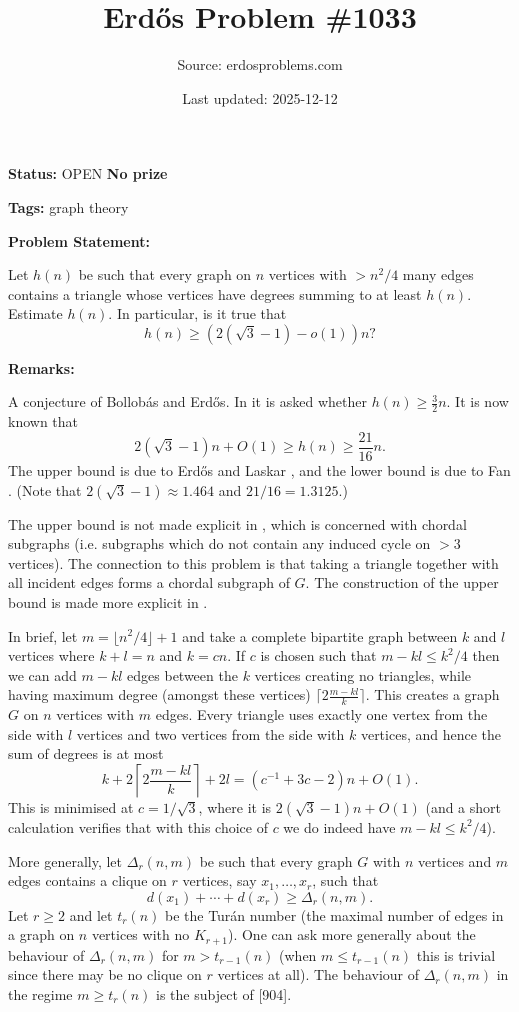 \documentclass{article}
\title{Erd\H{o}s Problem \#1033}
\date{Last updated: 2025-12-12}
\author{Source: erdosproblems.com}
\begin{document}
\maketitle

\noindent\textbf{Status:} OPEN \quad \textbf{No prize}

\noindent\textbf{Tags:} graph theory

\medskip
\noindent\textbf{Problem Statement:}

Let $h(n)$ be such that every graph on $n$ vertices with $>n^2/4$ many edges contains a triangle whose vertices have degrees summing to at least $h(n)$. Estimate $h(n)$. In particular, is it true that\[h(n)\geq (2(\sqrt{3}-1)-o(1))n?\]

\bigskip
\noindent\textbf{Remarks:}

A conjecture of Bollob\'{a}s and Erd\H{o}s. In \cite{Er82e} it is asked whether $h(n)\geq \frac{3}{2}n$. It is now known that\[2(\sqrt{3}-1)n +O(1)\geq h(n) \geq \frac{21}{16}n.\]The upper bound is due to Erd\H{o}s and Laskar \cite{ErLa85}, and the lower bound is due to Fan \cite{Fa88}. (Note that $2(\sqrt{3}-1)\approx 1.464$ and $21/16=1.3125$.)

The upper bound is not made explicit in \cite{ErLa85}, which is concerned with chordal subgraphs (i.e. subgraphs which do not contain any induced cycle on $>3$ vertices). The connection to this problem is that taking a triangle together with all incident edges forms a chordal subgraph of $G$. The construction of the upper bound is made more explicit in \cite{Fa88}. 

In brief, let $m=\lfloor n^2/4\rfloor+1$ and take a complete bipartite graph between $k$ and $l$ vertices where $k+l=n$ and $k=cn$. If $c$ is chosen such that $m-kl\leq k^2/4$ then we can add $m-kl$ edges between the $k$ vertices creating no triangles, while having maximum degree (amongst these vertices) $\lceil 2\frac{m-kl}{k}\rceil$. This creates a graph $G$ on $n$ vertices with $m$ edges. Every triangle uses exactly one vertex from the side with $l$ vertices and two vertices from the side with $k$ vertices, and hence the sum of degrees is at most\[k+2\left\lceil 2\frac{m-kl}{k}\right\rceil+2l=(c^{-1}+3c-2)n+O(1).\]This is minimised at $c=1/\sqrt{3}$, where it is $2(\sqrt{3}-1)n+O(1)$ (and a short calculation verifies that with this choice of $c$ we do indeed have $m-kl\leq k^2/4$).

More generally, let $\Delta_r(n,m)$ be such that every graph $G$ with $n$ vertices and $m$ edges contains a clique on $r$ vertices, say $x_1,\ldots,x_r$, such that\[d(x_1)+\cdots+d(x_r)\geq \Delta_r(n,m).\]Let $r\geq 2$ and let $t_r(n)$ be the Tur\'{a}n number (the maximal number of edges in a graph on $n$ vertices with no $K_{r+1}$). One can ask more generally about the behaviour of $\Delta_r(n,m)$ for $m>t_{r-1}(n)$ (when $m\leq t_{r-1}(n)$ this is trivial since there may be no clique on $r$ vertices at all). The behaviour of $\Delta_r(n,m)$ in the regime $m\geq t_r(n)$ is the subject of [904].
\end{document}
